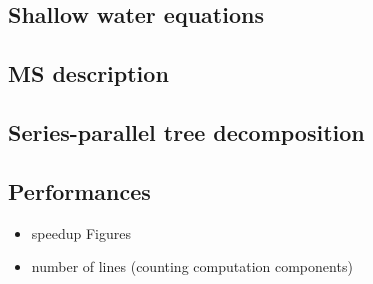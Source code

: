 \subsection{Shallow water equations}
\subsection{MS description}
\subsection{Series-parallel tree decomposition}
\subsection{Performances}
\begin{itemize}
\item speedup Figures
\item number of lines (counting computation components)
\end{itemize}